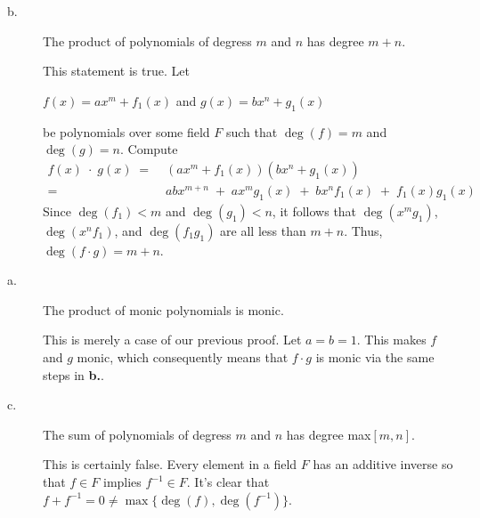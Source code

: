 \documentclass[../hw_sols.tex]{subfiles}
\begin{document}
\begin{description}

\item[b.] The product of polynomials of degress $m$ and $n$ has degree $m+n$.

\begin{solution}
This statement is true. Let 
\begin{center}
	$f(x) = ax^m + f_1(x)$ and $g(x) = bx^n + g_1(x)$
\end{center}
be polynomials over some field $F$ such that $\deg(f) = m$ and $\deg(g) = n$. 
Compute 
\begin{align*}
	f(x) \; \cdot \; g(x) \; 
	=& \; (ax^m + f_1(x)) (bx^n + g_1(x)) \\
	=& \; abx^{m+n} \; + \; ax^mg_1(x) \; + \; bx^nf_1(x) \; + \; f_1(x)g_1(x)
\end{align*}
Since $\deg(f_1) < m$ and $\deg(g_1) < n$, it follows that 
$\deg(x^mg_1)$, $\deg(x^nf_1)$, and $\deg(f_1g_1)$ are all less than $m + n$. 
Thus, $\deg(f \cdot g) = m + n$.
\end{solution}

\item[a.] The product of monic polynomials is monic.

\begin{solution}
This is merely a case of our previous proof. Let $a = b = 1$. This makes $f$ 
and $g$ monic, which consequently means that $f \cdot g$ is monic via the 
same steps in \textbf{b.}.
\end{solution}

\item[c.] The sum of polynomials of degress $m$ and $n$ has degree max$[m,n]$.

\begin{solution}
This is certainly false. Every element in a field $F$ has an additive inverse 
so that $f \in F$ implies $f^{-1} \in F$. It's clear that 
$f + f^{-1} = 0 \neq \max\{\deg(f),\deg(f^{-1})\}$.
\end{solution}

\end{description}


\newpage


\end{document}
